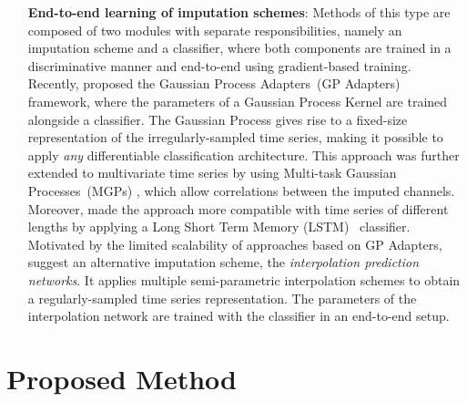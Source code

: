 \documentclass{article}
\begin{document}
\begin{enumerate}[nosep, parsep=0.5em, labelindent=0em, itemsep=0em,
  align=left, labelwidth=*, leftmargin=0em]
\item[\textbf{End-to-end learning of imputation schemes}:]
Methods of this type are composed of two modules with separate
responsibilities, namely an imputation scheme and a classifier, where
both components are trained in a discriminative manner and end-to-end using
gradient-based training.
Recently, \citet{li2016scalable} proposed the Gaussian Process
Adapters~(GP Adapters) framework, where the parameters of a Gaussian
Process Kernel are trained alongside a classifier. 
The Gaussian Process gives rise to a fixed-size representation of the
irregularly-sampled time series, making it possible to  apply \emph{any}
differentiable classification architecture. This approach was further
extended to multivariate time series by \citet{futoma2017learning} using
Multi-task Gaussian Processes~(MGPs) \citep{bonilla2008multi}, which
allow correlations between the imputed channels.
Moreover, \citet{futoma2017learning} made the approach more compatible
with time series of different lengths by applying a Long Short Term
Memory (LSTM)~\citep{hochreiter1997long} classifier.
Motivated by the limited scalability of approaches based on GP Adapters,
\citet{shukla2018interpolationprediction} suggest an alternative
imputation scheme, the \emph{interpolation prediction networks}.
It applies multiple semi-parametric
interpolation schemes to obtain a regularly-sampled time series
representation. The parameters of the interpolation network are trained
with the classifier in an end-to-end setup.

\end{enumerate}

\section{Proposed Method}
\end{document}
